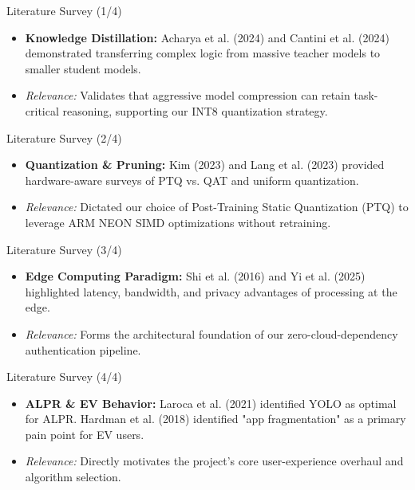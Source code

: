 \documentclass{beamer}
\begin{document}
\begin{frame}{Literature Survey (1/4)}
\begin{itemize}
    \item \textbf{Knowledge Distillation:} Acharya et al. (2024) and Cantini et al. (2024) demonstrated transferring complex logic from massive teacher models to smaller student models.
    \item \textit{Relevance:} Validates that aggressive model compression can retain task-critical reasoning, supporting our INT8 quantization strategy.
\end{itemize}
\end{frame}

\begin{frame}{Literature Survey (2/4)}
\begin{itemize}
    \item \textbf{Quantization \& Pruning:} Kim (2023) and Lang et al. (2023) provided hardware-aware surveys of PTQ vs. QAT and uniform quantization.
    \item \textit{Relevance:} Dictated our choice of Post-Training Static Quantization (PTQ) to leverage ARM NEON SIMD optimizations without retraining.
\end{itemize}
\end{frame}

\begin{frame}{Literature Survey (3/4)}
\begin{itemize}
    \item \textbf{Edge Computing Paradigm:} Shi et al. (2016) and Yi et al. (2025) highlighted latency, bandwidth, and privacy advantages of processing at the edge.
    \item \textit{Relevance:} Forms the architectural foundation of our zero-cloud-dependency authentication pipeline.
\end{itemize}
\end{frame}

\begin{frame}{Literature Survey (4/4)}
\begin{itemize}
    \item \textbf{ALPR \& EV Behavior:} Laroca et al. (2021) identified YOLO as optimal for ALPR. Hardman et al. (2018) identified "app fragmentation" as a primary pain point for EV users.
    \item \textit{Relevance:} Directly motivates the project's core user-experience overhaul and algorithm selection.
\end{itemize}
\end{frame}
\end{document}
